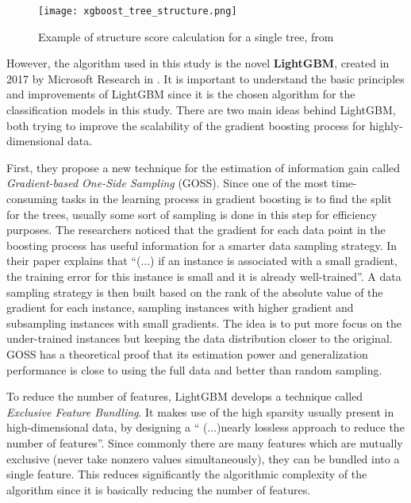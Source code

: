\begin{figure}[!h]
    \centering
    \texttt{[image: xgboost\_tree\_structure.png]} 
    \caption{Example of structure score calculation for a single tree, from \cite{chen2015xgboost}}
    \label{fig:xgboost-tree} 
  \end{figure}
  

However, the algorithm used in this study is the novel \textbf{LightGBM}, created in 2017 by Microsoft Research in \cite{ke2017lightgbm}. It is important to understand the basic principles and improvements of LightGBM since it is the chosen algorithm for the classification models in this study. There are two main ideas behind LightGBM, both trying to improve the scalability of the gradient boosting process for highly-dimensional data.

First, they propose a new technique for the estimation of information gain called \textit{Gradient-based One-Side Sampling} (GOSS). Since one of the most time-consuming tasks in the learning process in gradient boosting is to find the split for the trees, usually some sort of sampling is done in this step for efficiency purposes. The researchers noticed that the gradient for each data point in the boosting process has useful information for a smarter data sampling strategy. In their paper \cite{ke2017lightgbm} explains that ``(...) if an instance is associated with a small gradient, the training error for this instance is small and it is already well-trained''. A data sampling strategy is then built based on the rank of the absolute value of the gradient for each instance, sampling instances with higher gradient and subsampling instances with small gradients. The idea is to put more focus on the under-trained instances but keeping the data distribution closer to the original. GOSS has a theoretical proof that its estimation power and generalization performance is close to using the full data and better than random sampling.

To reduce the number of features, LightGBM develops a technique called \textit{Exclusive Feature Bundling}. It makes use of the high sparsity usually present in high-dimensional data, by designing a `` (...)nearly lossless approach to reduce the number of features''. Since commonly there are many features which are mutually exclusive (never take nonzero values simultaneously), they can be bundled into a single feature. This reduces significantly the algorithmic complexity of the algorithm since it is basically reducing the number of features. 

